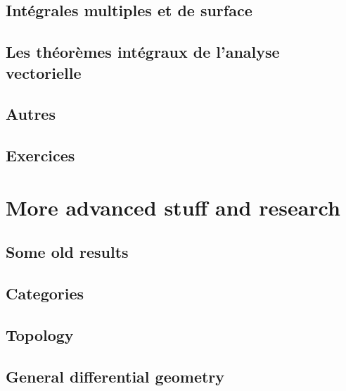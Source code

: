 \chapter{Intégrales multiples et de surface}


\chapter{Les théorèmes intégraux de l'analyse vectorielle}


\chapter{Autres}


\chapter{Exercices}




\part{More advanced stuff and research}



\chapter{Some old results}


\chapter{Categories}        \label{chap_category}


\chapter{Topology}              \label{chap_topology}



\chapter{General differential geometry} \label{Chapitre_FB}


